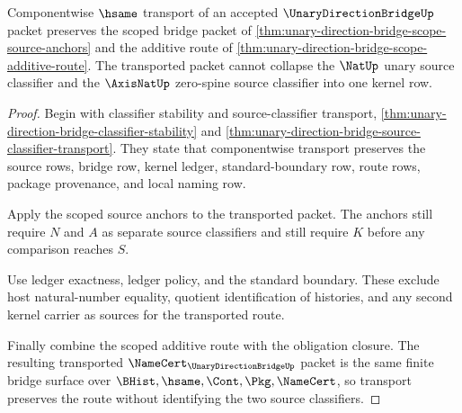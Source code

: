 \begin{theorem}
\label{thm:unary-direction-bridge-scope-namecert-transport}
Componentwise $\hsame$ transport of an accepted $\UnaryDirectionBridgeUp$ packet preserves the scoped bridge packet of \autoref{thm:unary-direction-bridge-scope-source-anchors} and the additive route of \autoref{thm:unary-direction-bridge-scope-additive-route}. The transported packet cannot collapse the $\NatUp$ unary source classifier and the $\AxisNatUp$ zero-spine source classifier into one kernel row.
\end{theorem}
\begin{proof}
Begin with classifier stability and source-classifier transport, \autoref{thm:unary-direction-bridge-classifier-stability} and \autoref{thm:unary-direction-bridge-source-classifier-transport}. They state that componentwise transport preserves the source rows, bridge row, kernel ledger, standard-boundary row, route rows, package provenance, and local naming row.

Apply the scoped source anchors to the transported packet. The anchors still require $N$ and $A$ as separate source classifiers and still require $K$ before any comparison reaches $S$.

Use ledger exactness, ledger policy, and the standard boundary. These exclude host natural-number equality, quotient identification of histories, and any second kernel carrier as sources for the transported route.

Finally combine the scoped additive route with the obligation closure. The resulting transported $\NameCert_{\UnaryDirectionBridgeUp}$ packet is the same finite bridge surface over $\BHist,\hsame,\Cont,\Pkg,\NameCert$, so transport preserves the route without identifying the two source classifiers.
\end{proof}

